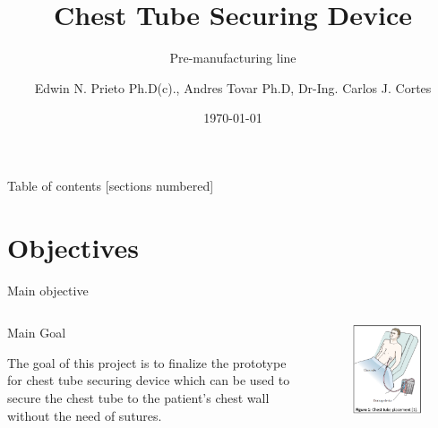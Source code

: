 \documentclass[10pt]{beamer}
\title{Chest Tube Securing Device}
\subtitle{Pre-manufacturing line}
\date{\today}
\date{}
\author{Edwin N. Prieto Ph.D(c)., Andres Tovar Ph.D, Dr-Ing. Carlos J. Cortes}
\institute{\textbf{Indiana University-Purdue University Indianapolis}}
\begin{document}
\maketitle
%


\begin{frame}{Table of contents}
  [sections numbered]
  \tableofcontents[]
\end{frame}

\section{Objectives}

\begin{frame}[fragile]{Main objective}
\begin{columns}[T,onlytextwidth]
\vspace{13mm}
\begin{alertblock}{Main Goal}

The goal of this project is to finalize the prototype for chest tube securing device which can be used to secure the chest tube to the patient’s chest wall without the need of sutures. 

\end{alertblock}
\begin{figure}
\includegraphics[scale=0.5]{State-art.png}
\end{figure}
\end{columns}
\end{frame}
\end{document}
